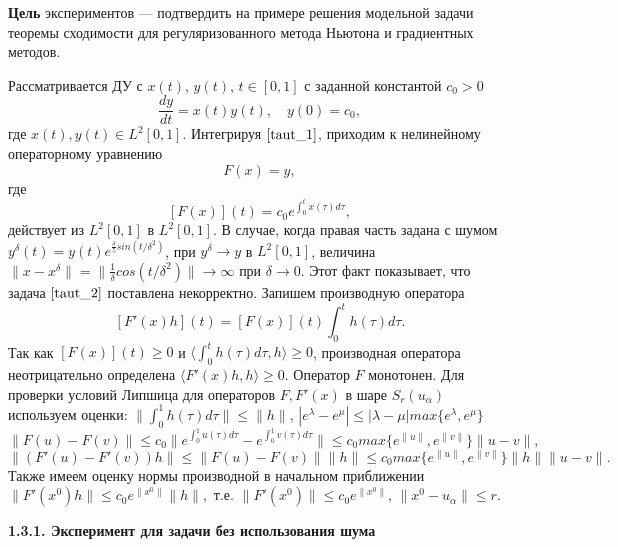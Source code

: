 {\bfseries Цель} экспериментов --- подтвердить на примере решения модельной задачи теоремы сходимости для регуляризованного метода Ньютона и градиентных методов.

Рассматривается ДУ с $x(t)$, $y(t)$, $t\in[0, 1]$ с заданной константой $c_0>0$
\begin{equation}\label{taut_1}
\frac{dy}{dt}=x(t)y(t), \quad y(0)=c_0,
\end{equation}
где $x(t), y(t)\in L^2[0,1]$. Интегрируя $\eqref{taut_1}$, приходим к нелинейному операторному уравнению
\begin{equation}\label{taut_2}
F(x)=y,
\end{equation}
где $$[F(x)](t)=c_0 e^{\int_{0}^{t}x(\tau)d\tau},$$
действует из $L^2[0,1]$ в $L^2[0,1]$. В случае, когда правая часть задана с шумом $y^\delta(t)=y(t)e^{\frac{\delta}{5} sin(t/{\delta}^2)}$, при $y^\delta\to y$ в $L^2[0,1]$, величина $\|x-x^\delta\|=\|\frac{1}{\delta}cos(t/{\delta}^2)\|\to\infty$ при $\delta\to 0$. Этот факт показывает, что задача $\eqref{taut_2}$ поставлена некорректно. Запишем производную оператора
\begin{equation}\label{taut_3}
[F'(x)h](t)=[F(x)](t)\int_{0}^{t}h(\tau)d\tau.
\end{equation}
Так как $[F(x)](t)\ge 0$ и $\langle\int_{0}^{t}h(\tau)d\tau, h\rangle\ge 0$, производная оператора неотрицательно определена $\langle F'(x)h, h\rangle\ge 0$. Оператор $F$ монотонен. Для проверки условий Липшица для операторов $F, F'(x)$ в шаре $S_r(u_\alpha)$ используем оценки: $\|\int_{0}^{1}h(\tau)d\tau\|\le\|h\|$, $|e^\lambda-e^\mu|\le|\lambda-\mu|max\{e^\lambda, e^\mu\}$
$$\|F(u)-F(v)\|\le c_0\|e^{\int_{0}^{1}u(\tau)d\tau}-e^{\int_{0}^{1}v(\tau)d\tau}\|
\le c_0 max\{e^{\|u\|},e^{\|v\|}\}\|u-v\|,$$
$$\|(F'(u)-F'(v))h\|\le\|F(u)-F(v)\|\|h\|\le c_0 max\{e^{\|u\|},e^{\|v\|}\}\|h\|\|u-v\|.$$
Также имеем оценку нормы производной в начальном приближении $\|F'(x^0)h\|\le c_0 e^{\|x^0\|}\|h\|,$ т.е. $\|F'(x^0)\|\le c_0 e^{\|x^0\|}$, $\|x^0-u_\alpha\|\le r$.

{\bfseries 1.3.1. Эксперимент для задачи без использования шума} 


